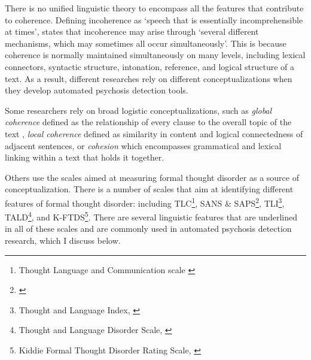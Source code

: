 There is no unified linguistic theory to encompass all the features that contribute to coherence. Defining incoherence as `speech that is essentially incomprehensible at times', \citet{andreasen1986tlc} states that incoherence may arise through `several different mechanisms, which may sometimes all occur simultaneously'. This is because coherence is normally maintained simultaneously on many levels, including lexical connectors, syntactic structure, intonation, reference, and logical structure of a text. As a result, different researches rely on different conceptualizations when they develop automated psychosis detection tools. 

Some researchers rely on broad logistic conceptualizations, such as \textit{global coherence} defined as  the relationship of every clause to the overall topic of the text \citep{glosser1991patterns}, \textit{local coherence} defined as  similarity in content and logical connectedness of adjacent sentences, or \textit{cohesion} which encompasses grammatical and lexical linking within a text that holds it together. 

Others use the scales aimed at measuring formal thought disorder as a source of conceptualization. There is a number of scales that aim at identifying different features of formal thought disorder: including TLC\footnote{Thought Language and Communication scale \citet{andreasen1986tlc}}, SANS \& SAPS\footnote{\citep{andreasen1984sans, andreasen1984saps}}, TLI\footnote{Thought and Language Index, \citet{liddle2002tli}}, TALD\footnote{Thought and Language Disorder Scale, \citet{kircher2014tald}}, and K-FTDS\footnote{Kiddie Formal Thought Disorder Rating Scale, \citet{caplan1989kftds}}. There are several linguistic features that are underlined in all of these scales and are commonly used in automated psychosis detection research, which I discuss below. 

